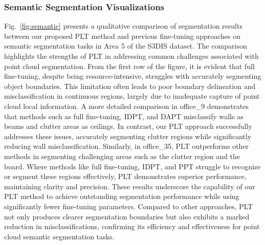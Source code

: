\subsubsection{Semantic Segmentation Visualizations}

Fig.~\ref{fig:semantic} presents a qualitative comparison of segmentation results between our proposed PLT method and previous fine-tuning approaches on semantic segmentation tasks in Area 5 of the S3DIS dataset. The comparison highlights the strengths of PLT in addressing common challenges associated with point cloud segmentation. From the first row of the figure, it is evident that full fine-tuning, despite being resource-intensive, struggles with accurately segmenting object boundaries. This limitation often leads to poor boundary delineation and misclassification in continuous regions, largely due to inadequate capture of point cloud local information. A more detailed comparison in office\_9 demonstrates that methods such as full fine-tuning, IDPT, and DAPT misclassify walls as beams and clutter areas as ceilings. In contrast, our PLT approach successfully addresses these issues, accurately segmenting clutter regions while significantly reducing wall misclassification. Similarly, in office\_35, PLT outperforms other methods in segmenting challenging areas such as the clutter region and the board. Where methods like full fine-tuning, IDPT, and PPT struggle to recognize or segment these regions effectively, PLT demonstrates superior performance, maintaining clarity and precision. These results underscore the capability of our PLT method to achieve outstanding segmentation performance while using significantly fewer fine-tuning parameters. Compared to other approaches, PLT not only produces clearer segmentation boundaries but also exhibits a marked reduction in misclassifications, confirming its efficiency and effectiveness for point cloud semantic segmentation tasks.











